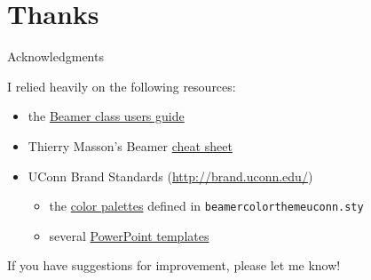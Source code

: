 \documentclass{beamer}
\begin{document}
\section{Thanks}

\begin{frame}{Acknowledgments}
\label{slide:acknowledgments}

I relied heavily on the following resources:
\begin{itemize}
\item the \href{http://texdoc.net/texmf-dist/doc/latex/beamer/doc/beameruserguide.pdf}{Beamer class users guide}
\item Thierry Masson's Beamer \href{http://www.cpt.univ-mrs.fr/~masson/latex/Beamer-appearance-cheat-sheet.pdf}{cheat sheet}
\item UConn Brand Standards (\url{http://brand.uconn.edu/})
\begin{itemize}
\item the \href{http://brand.uconn.edu/standards/color-palette/}{color palettes} defined in {\tt beamercolorthemeuconn.sty}
\item several \href{http://brand.uconn.edu/resources/powerpoint-templates/}{PowerPoint templates}
\end{itemize}
\end{itemize}

\vfill
If you have suggestions for improvement, please let me know!

\center\hyperlink{mailto:brunson@uchc.edu}{}

\end{frame}
\end{document}
